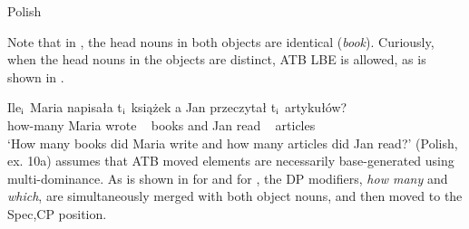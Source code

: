 \documentclass[output=paper]{langscibook}
\begin{document}
\ea Polish
	\label{shenatb1}
	\z 
\z 

Note that in , the head nouns in both objects are identical (\textit{book}). Curiously, when the head nouns in the objects are distinct, ATB LBE is allowed, as is shown in .

\ea
	\label{shenatb2}
	\gll Ile$_{\textnormal{i}}$ Maria napisała t$_{\textnormal{i}}$ książek a Jan przeczytał t$_{\textnormal{i}}$ artykułów? \\
	how-many Maria wrote {~} books and Jan read {~} articles\\
	\glt `How many books did Maria write and how many articles did Jan read?'  (Polish, \citealt{Citko:2006} ex. 10a)
\z 
\cite{Citko:2006} assumes that ATB moved elements are necessarily base-generated using multi-dominance. As is shown in  for  and  for , the DP modifiers, \textit{how many} and \textit{which}, are simultaneously merged with both object nouns, and then moved to the Spec,CP position.  
\end{document}
